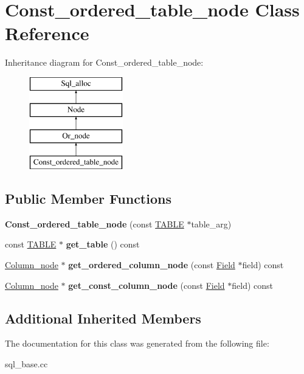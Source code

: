 \hypertarget{classConst__ordered__table__node}{}\section{Const\+\_\+ordered\+\_\+table\+\_\+node Class Reference}
\label{classConst__ordered__table__node}
Inheritance diagram for Const\+\_\+ordered\+\_\+table\+\_\+node\+:\begin{figure}[H]
\begin{center}
\leavevmode
\includegraphics[height=4.000000cm]{classConst__ordered__table__node}
\end{center}
\end{figure}
\subsection*{Public Member Functions}
\begin{DoxyCompactItemize}
\item 
{\bfseries Const\+\_\+ordered\+\_\+table\+\_\+node} (const \mbox{\hyperlink{structTABLE}{T\+A\+B\+LE}} $\ast$table\+\_\+arg)
\item 
\mbox{\label{classConst__ordered__table__node_aa7464277a0835bbf07aca0cfd6e63b60}} 
const \mbox{\hyperlink{structTABLE}{T\+A\+B\+LE}} $\ast$ {\bfseries get\+\_\+table} () const
\item 
\mbox{\hyperlink{classOr__node}{Column\+\_\+node}} $\ast$ {\bfseries get\+\_\+ordered\+\_\+column\+\_\+node} (const \mbox{\hyperlink{classField}{Field}} $\ast$field) const
\item 
\mbox{\hyperlink{classOr__node}{Column\+\_\+node}} $\ast$ {\bfseries get\+\_\+const\+\_\+column\+\_\+node} (const \mbox{\hyperlink{classField}{Field}} $\ast$field) const
\end{DoxyCompactItemize}
\subsection*{Additional Inherited Members}


The documentation for this class was generated from the following file\+:\begin{DoxyCompactItemize}
\item 
sql\+\_\+base.\+cc\end{DoxyCompactItemize}
